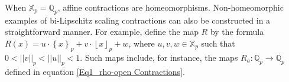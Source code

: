 \documentclass[a4paper, 12pt]{article}
\theoremstyle{definition}
\begin{document}
	When $\mathbb{X}_{p} = \mathbb{Q}_{p}$, affine contractions are homeomorphisms. Non-homeomorphic examples of bi-Lipschitz scaling contractions can also be constructed in a straightforward manner. 
	For example, define the map $R$ by the formula
	$R \left(  x  \right)  = u \cdot  \left\{  x  \right\}_{p} + v\cdot  \left\lfloor  x   \right\rfloor_{p} + w $, 
	where $ u,v,w \in \mathbb{X}_{p}$ such that $ 0  <  \left| \left|  v  \right|  \right|_{p}  <  \left| \left|  u  \right|  \right|_{p}  < 1$. 
	Such maps include, for instance, the maps $R_{a}: \mathbb{Q}_{p} \to \mathbb{Q}_{p}$ defined in equation \eqref{Eq1_rho-open Contractions}.
	
	
	
	
	\paragraph{}
	
\end{document}
